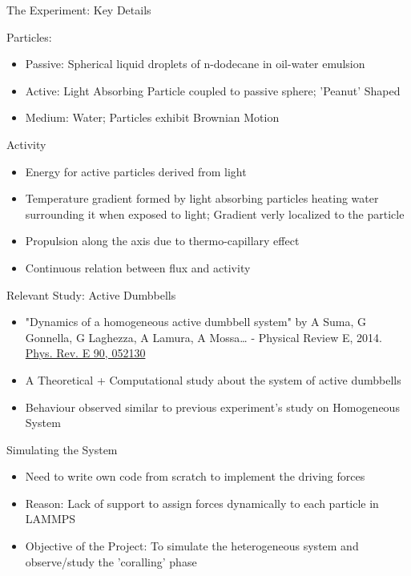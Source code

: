 \documentclass[10pt]{beamer}
\begin{document}
\begin{frame}[label={sec:orgb312622}]{The Experiment: Key Details}
\begin{block}{Particles:}
\begin{itemize}
\item Passive: Spherical liquid droplets of n-dodecane in oil-water emulsion
\item Active: Light Absorbing Particle coupled to passive sphere; 'Peanut' Shaped
\item Medium: Water; Particles exhibit Brownian Motion
\end{itemize}
\end{block}
\begin{block}{Activity}
\begin{itemize}
\item Energy for active particles derived from light
\item Temperature gradient formed by light absorbing particles heating water surrounding it when exposed to light; Gradient verly localized to the particle
\item Propulsion along the axis due to thermo-capillary effect
\item Continuous relation between flux and activity
\end{itemize}
\end{block}
\end{frame}

\begin{frame}[label={sec:org15c105f}]{Relevant Study: Active Dumbbells}
\begin{itemize}
\item "Dynamics of a homogeneous active dumbbell system" by A Suma, G Gonnella, G Laghezza, A Lamura, A Mossa… - Physical Review E, 2014. \href{https://journals.aps.org/pre/abstract/10.1103/PhysRevE.90.052130}{Phys. Rev. E 90, 052130}
\item A Theoretical + Computational study about the system of active dumbbells
\item Behaviour observed similar to previous experiment's study on Homogeneous System
\end{itemize}
\end{frame}

\begin{frame}[label={sec:orgc172cf9}]{Simulating the System}
\begin{itemize}
\item Need to write own code from scratch to implement the driving forces
\item Reason: Lack of support to assign forces dynamically to each particle in LAMMPS
\item Objective of the Project: To simulate the heterogeneous system and observe/study the 'coralling' phase
\end{itemize}
\end{frame}
\end{document}
